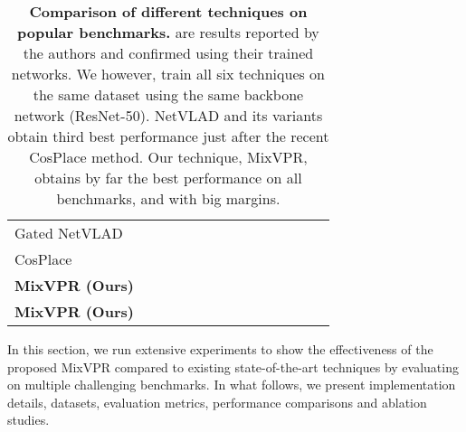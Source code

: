 \documentclass[10pt,twocolumn,letterpaper]{article}
\begin{document}
\begin{table*}[tbh]
{\begin{tabular}{|l|c|ccc|ccc|ccc|ccc|}
Gated NetVLAD \cite{zhang2021vector}            & &           &           &           &           &           &           &           &           &           &           &           &           \\
CosPlace \cite{berton2022rethinking}            & &           &           &           &           &           &           &           &           &           &           &           &           \\ \hline
\textbf{MixVPR (Ours) }                         & &           &           &           &           &           &           &           &           &           &           &           &  \\
\textbf{MixVPR (Ours) }                         & &  &  &  &  &  &  &  &  &  &  &  &  \\ \hline
\end{tabular}}
\caption{\textbf{Comparison of different techniques on popular benchmarks.}  are results reported by the authors and confirmed using their trained networks. We however, train all six techniques on the same dataset using the same backbone network (ResNet-50). NetVLAD and its variants obtain third best performance just after the recent CosPlace method. Our technique, MixVPR, obtains by far the best performance on all benchmarks, and with big margins.}
\label{tab:sota}
\end{table*}
In this section, we run extensive experiments to show the effectiveness of the proposed MixVPR compared to existing state-of-the-art techniques by evaluating on multiple challenging benchmarks. In what follows, we present implementation details, datasets, evaluation metrics, performance comparisons and ablation studies.
\end{document}
